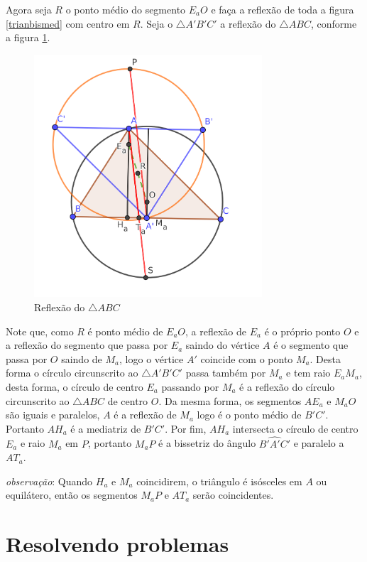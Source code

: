 \documentclass[12pt, openright, a4paper, brazil, openany, oneside]{abntex2}
\begin{document}
Agora seja $R$ o ponto médio do segmento $E_{a}O$ e faça a reflexão de toda a figura \ref{trianbismed} com centro em $R$. Seja o  $\triangle A'B'C'$ a reflexão do $\triangle ABC$, conforme a figura \ref{trianref}.

\begin{figure}[h]
	
	\center
	
	\includegraphics[width=8.5cm]{trianreflexao.png}
	\caption{Reflexão do $\triangle ABC$ \label{trianref}}
	
\end{figure}

Note que, como $R$ é ponto médio de $E_{a}O$, a reflexão de $E_a$ é o próprio ponto $O$ e a reflexão do segmento que passa por $E_a$ saindo do vértice $A$ é o segmento que passa por $O$ saindo de $M_a$, logo o vértice $A'$ coincide com o ponto $M_a$. Desta forma o círculo circunscrito ao $\triangle A'B'C'$ passa também por $M_a$ e tem raio $E_{a}M_{a}$, desta forma, o círculo de centro $E_a$ passando por $M_a$ é a reflexão do círculo circunscrito ao $\triangle ABC$ de centro $O$. Da mesma forma, os segmentos $AE_a$ e $M_{a}O$ são iguais e paralelos, $A$ é a reflexão de $M_a$ logo é o ponto médio de $B'C'$. Portanto $AH_a$ é a mediatriz de $B'C'$. Por fim, $AH_a$ intersecta o círculo de centro $E_a$ e raio $M_a$ em $P$, portanto $M_aP$ é a bissetriz do ângulo $\hat{B'A'C'}$ e paralelo a $AT_a$.

\textit{observação}: Quando $H_a$ e $M_a$ coincidirem, o triângulo é isósceles em $A$ ou equilátero, então os segmentos $M_{a}P$ e $AT_a$ serão coincidentes.

\chapter{Resolvendo problemas}
\end{document}
